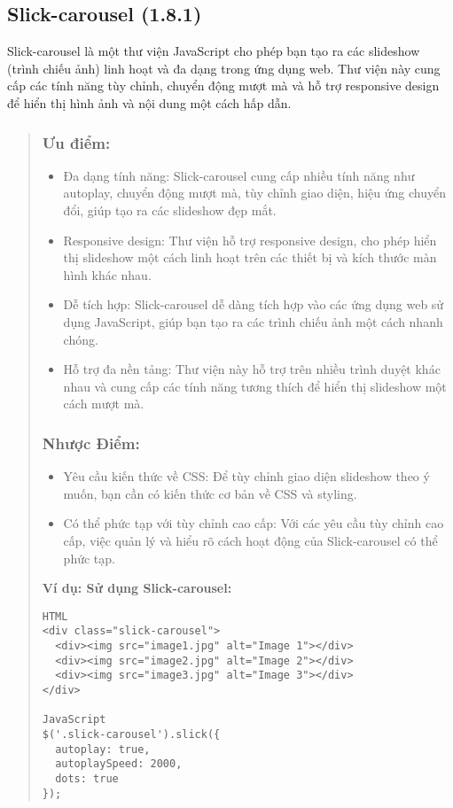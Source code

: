 \subsection{Slick-carousel (1.8.1)}

Slick-carousel là một thư viện JavaScript cho phép bạn tạo ra các slideshow (trình chiếu ảnh) linh hoạt và đa dạng trong ứng dụng web. Thư viện này cung cấp các tính năng tùy chỉnh, chuyển động mượt mà và hỗ trợ responsive design để hiển thị hình ảnh và nội dung một cách hấp dẫn.

\begin{quote}
\subsubsection{Ưu điểm:}
\begin{itemize}
  \item Đa dạng tính năng: Slick-carousel cung cấp nhiều tính năng như autoplay, chuyển động mượt mà, tùy chỉnh giao diện, hiệu ứng chuyển đổi, giúp tạo ra các slideshow đẹp mắt.
  \item Responsive design: Thư viện hỗ trợ responsive design, cho phép hiển thị slideshow một cách linh hoạt trên các thiết bị và kích thước màn hình khác nhau.
  \item Dễ tích hợp: Slick-carousel dễ dàng tích hợp vào các ứng dụng web sử dụng JavaScript, giúp bạn tạo ra các trình chiếu ảnh một cách nhanh chóng.
  \item Hỗ trợ đa nền tảng: Thư viện này hỗ trợ trên nhiều trình duyệt khác nhau và cung cấp các tính năng tương thích để hiển thị slideshow một cách mượt mà.
\end{itemize}

\subsubsection{Nhược Điểm:}
\begin{itemize}
  \item Yêu cầu kiến thức về CSS: Để tùy chỉnh giao diện slideshow theo ý muốn, bạn cần có kiến thức cơ bản về CSS và styling.
  \item Có thể phức tạp với tùy chỉnh cao cấp: Với các yêu cầu tùy chỉnh cao cấp, việc quản lý và hiểu rõ cách hoạt động của Slick-carousel có thể phức tạp.
\end{itemize}

\textbf{Ví dụ: Sử dụng Slick-carousel:}
\begin{lstlisting}
HTML
<div class="slick-carousel">
  <div><img src="image1.jpg" alt="Image 1"></div>
  <div><img src="image2.jpg" alt="Image 2"></div>
  <div><img src="image3.jpg" alt="Image 3"></div>
</div>

JavaScript
$('.slick-carousel').slick({
  autoplay: true,
  autoplaySpeed: 2000,
  dots: true
});
\end{lstlisting}
\end{quote}


